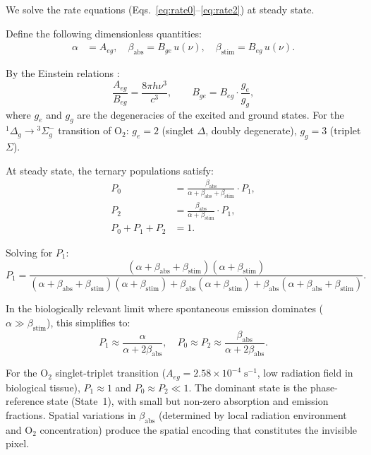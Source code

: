 \documentclass[11pt,twocolumn,a4paper]{article}
\begin{document}
We solve the rate equations (Eqs.~\ref{eq:rate0}--\ref{eq:rate2}) at steady state.

Define the following dimensionless quantities:
\begin{align}
\alpha &= A_{eg}, \quad \beta_{\mathrm{abs}} = B_{ge}\, u(\nu), \quad \beta_{\mathrm{stim}} = B_{eg}\, u(\nu).
\end{align}

By the Einstein relations \citep{Einstein1917}:
\begin{equation}
\frac{A_{eg}}{B_{eg}} = \frac{8\pi h\nu^3}{c^3}, \qquad B_{ge} = B_{eg} \cdot \frac{g_e}{g_g},
\end{equation}
where $g_e$ and $g_g$ are the degeneracies of the excited and ground states.
For the ${}^1\Delta_g \to {}^3\Sigma_g^-$ transition of O$_2$: $g_e = 2$ (singlet $\Delta$, doubly degenerate), $g_g = 3$ (triplet $\Sigma$).

At steady state, the ternary populations satisfy:
\begin{align}
P_0 &= \frac{\beta_{\mathrm{abs}}}{\alpha + \beta_{\mathrm{abs}} + \beta_{\mathrm{stim}}} \cdot P_1, \\
P_2 &= \frac{\beta_{\mathrm{abs}}}{\alpha + \beta_{\mathrm{stim}}} \cdot P_1, \\
P_0 + P_1 + P_2 &= 1.
\end{align}

Solving for $P_1$:
\begin{equation}
P_1 = \frac{(\alpha + \beta_{\mathrm{abs}} + \beta_{\mathrm{stim}})(\alpha + \beta_{\mathrm{stim}})}{(\alpha + \beta_{\mathrm{abs}} + \beta_{\mathrm{stim}})(\alpha + \beta_{\mathrm{stim}}) + \beta_{\mathrm{abs}}(\alpha + \beta_{\mathrm{stim}}) + \beta_{\mathrm{abs}}(\alpha + \beta_{\mathrm{abs}} + \beta_{\mathrm{stim}})}.
\end{equation}

In the biologically relevant limit where spontaneous emission dominates ($\alpha \gg \beta_{\mathrm{stim}}$), this simplifies to:
\begin{equation}
P_1 \approx \frac{\alpha}{\alpha + 2\beta_{\mathrm{abs}}}, \quad P_0 \approx P_2 \approx \frac{\beta_{\mathrm{abs}}}{\alpha + 2\beta_{\mathrm{abs}}}.
\end{equation}

For the O$_2$ singlet-triplet transition ($A_{eg} = 2.58 \times 10^{-4}\;\mathrm{s}^{-1}$, low radiation field in biological tissue), $P_1 \approx 1$ and $P_0 \approx P_2 \ll 1$.
The dominant state is the phase-reference state (State~1), with small but non-zero absorption and emission fractions.
Spatial variations in $\beta_{\mathrm{abs}}$ (determined by local radiation environment and O$_2$ concentration) produce the spatial encoding that constitutes the invisible pixel.
\end{document}
